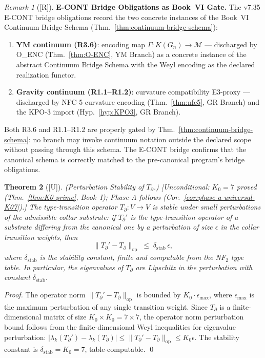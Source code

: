 \documentclass[12pt,oneside]{amsbook}
\theoremstyle{plain}
\newtheorem{theorem}{Theorem}[section]
\theoremstyle{definition}
\theoremstyle{remark}
\newtheorem{remark}[theorem]{Remark}
\newcommand{\status}[1]{\textup{[#1]}}
\begin{document}
\begin{remark}[\status{R}]\label{rem:econt-gate}
\textbf{E-CONT Bridge Obligations as Book~VI Gate.}
The v7.35 E-CONT bridge obligations record the two concrete
instances of the Book~VI Continuum Bridge Schema
(Thm.~\ref{thm:continuum-bridge-schema}):
\begin{enumerate}[label=\textup{(\roman*)}]
  \item \textbf{YM continuum (R3.6)}: encoding map
    $\Gamma: K(G_n) \to \mathcal{M}$ --- discharged by O\_ENC
    (Thm.~\ref{thm:O-ENC}, YM Branch) as a concrete instance
    of the abstract Continuum Bridge Schema with the Weyl encoding
    as the declared realization functor.
  \item \textbf{Gravity continuum (R1.1--R1.2)}: curvature
    compatibility E3-proxy --- discharged by NFC-5 curvature
    encoding (Thm.~\ref{thm:nfc5}, GR Branch) and the KPO-3
    import (Hyp.~\ref{hyp:KPO3}, GR Branch).
\end{enumerate}
Both R3.6 and R1.1--R1.2 are properly gated by
Thm.~\ref{thm:continuum-bridge-schema}: no branch may invoke
continuum notation outside the declared scope without passing
through this schema.  The E-CONT bridge confirms that the
canonical schema is correctly matched to the pre-canonical
program's bridge obligations.
\end{remark}

\begin{theorem}[\status{U}]\label{thm:T-partial-stability}
\textup{(Perturbation Stability of $T_\partial$.)}
\textup{[Unconditional: $K_0=7$ proved (Thm.~\ref{thm:K0-prime}, Book~I); Phase-A follows (Cor.~\ref{cor:phase-a-universal-K07}).]}
The type-transition operator $T_\partial : V \to V$ is stable
under small perturbations of the admissible collar substrate:
if $T_\partial'$ is the type-transition operator of a
substrate differing from the canonical one by a perturbation of
size $\epsilon$ in the collar transition weights, then
\[
  \|T_\partial' - T_\partial\|_{\mathrm{op}} \;\leq\;
  \delta_{\mathrm{stab}}\,\epsilon,
\]
where $\delta_{\mathrm{stab}}$ is the stability constant,
finite and computable from the NF$_2$ type table.  In
particular, the eigenvalues of $T_\partial$ are Lipschitz
in the perturbation with constant $\delta_{\mathrm{stab}}$.
\end{theorem}

\begin{proof}
The operator norm $\|T_\partial' - T_\partial\|_{\mathrm{op}}$
is bounded by $K_0 \cdot \epsilon_{\max}$, where
$\epsilon_{\max}$ is the maximum perturbation of any single
transition weight.  Since $T_\partial$ is a finite-dimensional
matrix of size $K_0 \times K_0 = 7 \times 7$, the operator
norm perturbation bound follows from the finite-dimensional
Weyl inequalities for eigenvalue perturbation:
$|\lambda_k(T_\partial') - \lambda_k(T_\partial)| \leq
\|T_\partial' - T_\partial\|_{\mathrm{op}} \leq K_0 \epsilon$.
The stability constant is $\delta_{\mathrm{stab}} = K_0 = 7$,
table-computable. \qed
\end{proof}
\end{document}
